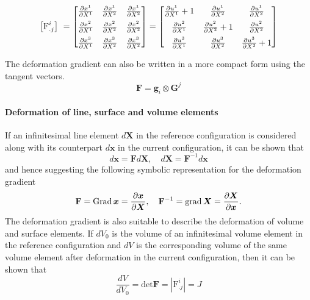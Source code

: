 \begin{equation}
    \left[\text{F}^{i}_{.j}\right]\ = 
    \begin{bmatrix}
        \pdv{x^{1}}{X^{1}} & \pdv{x^{1}}{X^{2}} & \pdv{x^{1}}{X^{2}} \\[0.5em]
        \pdv{x^{2}}{X^{1}} & \pdv{x^{2}}{X^{2}} & \pdv{x^{2}}{X^{2}} \\[0.5em]
        \pdv{x^{3}}{X^{1}} & \pdv{x^{3}}{X^{2}} & \pdv{x^{3}}{X^{2}}
    \end{bmatrix} = 
    \begin{bmatrix}
        \pdv{u^{1}}{X^{1}} + 1 & \pdv{u^{1}}{X^{2}} & \pdv{u^{1}}{X^{2}} \\[0.5em]
        \pdv{u^{2}}{X^{1}} & \pdv{u^{2}}{X^{2}} + 1 & \pdv{u^{2}}{X^{2}} \\[0.5em]
        \pdv{u^{3}}{X^{1}} & \pdv{u^{3}}{X^{2}} & \pdv{u^{3}}{X^{2}} + 1
    \end{bmatrix}
\end{equation}

The deformation gradient can also be written in a more compact form using the tangent vectors.
\begin{equation}
    \mathbf{F} = \bm{g}_{i} \otimes \bm{G}^{j}
\end{equation}
\paragraph*{Deformation of line, surface and volume elements} 
If an infinitesimal line element \(d\bm{X}\) in the reference configuration is considered along with its counterpart \(d\bm{x}\) in the current configuration, it can be shown that
\begin{equation}
    d\bm{x} = \mathbf{F} d\bm{X}, \quad
    d\bm{X} = \mathbf{F}^{-1} d\bm{x}
    \label{eq:linemap}
\end{equation}
and hence suggesting the following symbolic representation for the deformation gradient
\begin{equation}
    \mathbf{F} = \text{Grad}\,{\bm{x}} = \pdv{\bm{x}}{\bm{X}}, \quad
    \mathbf{F}^{-1} = \text{grad}\,{\bm{X}} = \pdv{\bm{X}}{\bm{x}}.
    \label{eq:defgrd_symbolic}
\end{equation}
The deformation gradient is also suitable to describe the deformation of volume and surface elements. If \(dV_{0}\) is the volume of an infinitesimal volume element in the reference configuration and \(dV\) is the corresponding volume of the same volume element after deformation in the current configuration, then it can be shown that
\begin{equation}
    \dfrac{dV}{dV_{0}} = \text{det}\mathbf{F} = |\text{F}^{i}_{.j}| =  J
    \label{eq:volumemap}
\end{equation}

